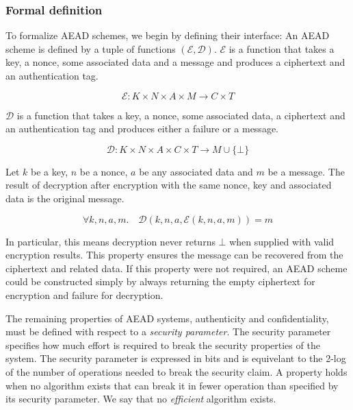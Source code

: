 \subsubsection{Formal definition}

To formalize AEAD schemes, we begin by defining their interface: An AEAD scheme
is defined by a tuple of functions $(\mathcal{E}, \mathcal{D})$. $\mathcal{E}$
is a function that takes a key, a nonce, some associated data and a message and
produces a ciphertext and an authentication tag.

\begin{equation}
    \mathcal{E} : K \times N \times A \times M \to C \times T
\end{equation}

$\mathcal{D}$ is a function that takes a key, a nonce, some associated data, a
ciphertext and an authentication tag and produces either a failure or a message.

\begin{equation}
    \mathcal{D} : K \times N \times A \times C \times T \to M \cup \{ \bot \}
\end{equation}

Let $k$ be a key, $n$ be a nonce, $a$ be any associated data and $m$ be a
message. The result of decryption after encryption with the same nonce, key and
associated data is the original message.

\begin{equation}
    \forall k, n, a, m.\quad \mathcal{D}(k, n, a, \mathcal{E}(k, n, a, m)) = m
\end{equation}

In particular, this means decryption never returns $\bot$ when supplied with
valid encryption results. This property ensures the message can be recovered
from the ciphertext and related data. If this property were not required, an
AEAD scheme could be constructed simply by always returning the empty ciphertext
for encryption and failure for decryption.

The remaining properties of AEAD systems, authenticity and confidentiality, must
be defined with respect to a \emph{security parameter}. The security parameter
specifies how much effort is required to break the security properties of the
system. The security parameter is expressed in bits and is equivelant to the
2-log of the number of operations needed to break the security claim. A property
holds when no algorithm exists that can break it in fewer operation than
specified by its security parameter. We say that no \emph{efficient} algorithm
exists.

